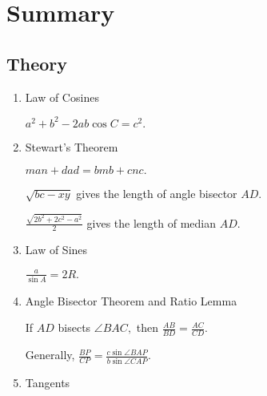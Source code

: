 \section{Summary}

\subsection{Theory}

\begin{enumerate}
    \item Law of Cosines
    
    \begin{itemize}
    
    \Item $a^2+b^2-2ab\cos C=c^2.$
    
    \end{itemize}
    
    \item Stewart's Theorem
    
    \begin{itemize}
    
    \Item $man+dad=bmb+cnc.$
    
    \Item $\sqrt{bc-xy}$ gives the length of angle bisector $AD.$
    
    \Item $\frac{\sqrt{2b^2+2c^2-a^2}}{2}$ gives the length of median $AD.$
    
    \end{itemize}
    
    \item Law of Sines
    
    \begin{itemize}
    
    \Item $\frac{a}{\sin A}=2R.$

    \end{itemize}

    \item Angle Bisector Theorem and Ratio Lemma
    
    \begin{itemize}
    
    \Item If $AD$ bisects $\angle BAC,$ then $\frac{AB}{BD}=\frac{AC}{CD}.$
    
    \Item Generally,  $\frac{BP}{CP}=\frac{c\sin \angle BAP}{b\sin \angle CAP}.$

    \end{itemize}
    
    \item Tangents
    
    \begin{itemize}
    

\end{itemize}
\end{enumerate}
